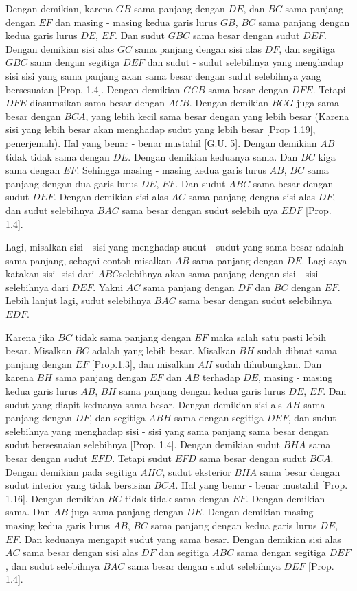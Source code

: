 \documentclass[a4paper]{book}
\begin{document}
Dengan demikian, karena $GB$ sama panjang dengan $DE$, dan $BC$ sama panjang 
dengan $EF$ dan masing - masing kedua garis lurus $GB$, $BC$ sama panjang dengan 
kedua garis lurus $DE$, $EF$. Dan sudut $GBC$ sama besar dengan sudut  $DEF$.
Dengan demikian sisi alas $GC$ sama panjang dengan sisi alas $DF$, dan segitiga
$GBC$ sama dengan segitiga  $DEF$ dan sudut - sudut selebihnya yang menghadap
sisi sisi yang sama panjang akan sama besar dengan sudut selebihnya yang 
bersesuaian [Prop. 1.4]. Dengan demikian $GCB$ sama besar dengan $DFE$. Tetapi
$DFE$ diasumsikan sama besar dengan $ACB$. Dengan demikian $BCG$ juga sama
besar dengan $BCA$, yang lebih kecil sama besar dengan yang lebih besar 
(Karena sisi yang lebih besar akan menghadap sudut yang lebih 
besar [Prop 1.19], penerjemah).
Hal yang benar - benar mustahil [G.U. 5]. Dengan demikian $AB$ tidak tidak sama dengan
$DE$. Dengan demikian keduanya sama. Dan $BC$ kiga sama dengan $EF$. Sehingga
masing - masing kedua garis lurus $AB$, $BC$ sama panjang dengan dua garis 
lurus $DE$, $EF$. Dan sudut $ABC$ sama besar dengan sudut $DEF$. Dengan demikian
sisi alas $AC$ sama panjang dengna sisi alas $DF$, dan sudut selebihnya $BAC$ 
sama besar dengan sudut selebih nya $EDF$ [Prop. 1.4].

Lagi, misalkan sisi - sisi yang menghadap sudut - sudut yang sama besar adalah
sama panjang, sebagai contoh misalkan $AB$ sama panjang dengan $DE$. Lagi saya
katakan sisi -sisi dari $ABC $selebihnya akan sama panjang dengan sisi - sisi
 selebihnya dari $DEF$. Yakni $AC$ sama panjang dengan $DF$ dan $BC$ dengan 
$EF$. Lebih lanjut lagi, sudut selebihnya $BAC$ sama besar dengan sudut 
selebihnya $EDF$.

Karena jika $BC$ tidak sama panjang dengan $EF$ maka salah satu pasti lebih besar.
Misalkan $BC$ adalah yang lebih besar. Misalkan $BH$ sudah dibuat sama panjang
dengan $EF$ [Prop.1.3], dan misalkan $AH$ sudah dihubungkan. Dan karena $BH$ sama
panjang dengan $EF$ dan $AB$ terhadap $DE$, masing - masing kedua garis lurus 
$AB$, $BH$ sama panjang dengan kedua garis lurus $DE$, $EF$. Dan sudut yang
diapit keduanya sama besar. Dengan demikian sisi als $AH$ sama panjang dengan 
$DF$, dan segitiga $ABH$ sama dengan segitiga $DEF$, dan sudut selebihnya yang
menghadap sisi - sisi yang sama panjang sama besar dengan sudut bersesuaian 
selebihnya [Prop. 1.4]. Dengan demikian sudut $BHA$ sama besar dengan sudut
$EFD$. Tetapi sudut $EFD$ sama besar dengan sudut $BCA$. Dengan demikian pada 
segitiga $AHC$, sudut eksterior $BHA$ sama besar dengan sudut interior yang tidak
bersisian $BCA$. Hal yang benar - benar mustahil [Prop. 1.16]. Dengan demikian 
$BC$ tidak tidak sama dengan $EF$. Dengan demikian sama. Dan $AB$ juga sama
panjang dengan $DE$. Dengan demikian masing - masing kedua garis lurus 
$AB$, $BC$ sama panjang dengan kedua garis lurus $DE$, $EF$. Dan keduanya mengapit
sudut yang sama besar. Dengan demikian sisi alas $AC$ sama besar dengan sisi 
alas $DF$ dan segitiga $ABC$ sama dengan segitiga $DEF$, dan sudut selebihnya
$BAC$ sama besar dengan sudut selebihnya $DEF$ [Prop. 1.4].
\end{document}
